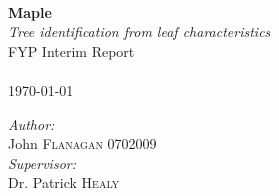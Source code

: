 \begin{titlepage}
 
\begin{center}
 
 
 
 
 
 
\HRule \\[0.8cm]
{ \huge \bfseries{Maple}}\\
   \emph{Tree identification from leaf characteristics}\\[1cm]
   FYP Interim Report\\[0.4cm]
 
\HRule \\[4.0cm]
 {\large{\today}}\\[9.0cm]

\begin{flushleft}
\emph{Author:}\\
John \textsc{Flanagan} 0702009\\[.5cm]
\emph{Supervisor:}\\
Dr. Patrick \textsc{Healy}
\end{flushleft}

 
\vfill
 

 
\end{center}
 
\end{titlepage}
